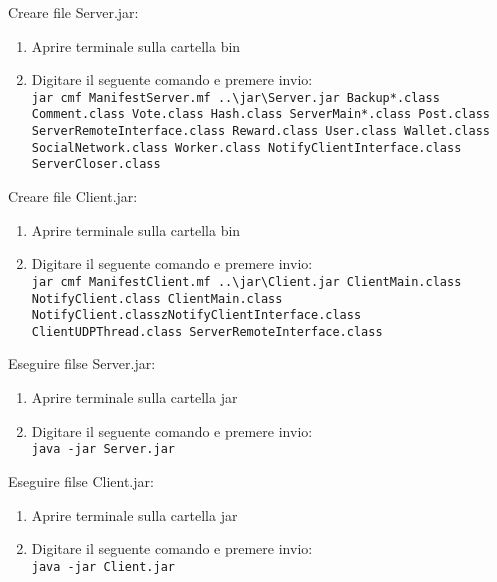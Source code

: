 \documentclass[11pt, a4paper, oneside]{article}
\begin{document}
Creare file Server.jar:
\begin{enumerate}
    \item Aprire terminale sulla cartella bin
    \item Digitare il seguente comando e premere invio:\\
    \texttt{jar cmf ManifestServer.mf ..\textbackslash jar\textbackslash Server.jar Backup*.class Comment.class Vote.class Hash.class ServerMain*.class Post.class ServerRemoteInterface.class 
    Reward.class User.class Wallet.class SocialNetwork.class Worker.class NotifyClientInterface.class ServerCloser.class}
\end{enumerate}
Creare file Client.jar:
\begin{enumerate}
    \item Aprire terminale sulla cartella bin
    \item Digitare il seguente comando e premere invio:\\
    \texttt{jar cmf ManifestClient.mf ..\textbackslash jar\textbackslash Client.jar ClientMain.class NotifyClient.class ClientMain.class NotifyClient.classzNotifyClientInterface.class ClientUDPThread.class ServerRemoteInterface.class}
\end{enumerate}
Eseguire filse Server.jar:
\begin{enumerate}
    \item Aprire terminale sulla cartella jar
    \item Digitare il seguente comando e premere invio:\\
    \texttt{java -jar Server.jar}
\end{enumerate}
Eseguire filse Client.jar:
\begin{enumerate}
    \item Aprire terminale sulla cartella jar
    \item Digitare il seguente comando e premere invio:\\
    \texttt{java -jar Client.jar}
\end{enumerate}
\end{document}
